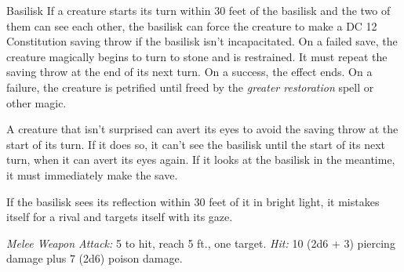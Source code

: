 \documentclass[10pt,a4paper,twoside,bg=print,twocolumn,openany,nodeprecatedcode]{dndbook}
\begin{document}
\begin{DndMonster}[float=t]{Basilisk}
\DndMonsterBasics[
armor-class = {15 (natural armor)},
hit-points = {\DndDice{8d8 + 16}},
speed = {20 ft.}
]
\DndMonsterAbilityScores[
 str = 16,
 dex = 8,
 con = 15,
 int = 2,
 wis = 8,
 cha = 7
]
\DndMonsterDetails[
senses = {darkvision 60 ft., passive perception 9},
challenge = 3,
]
If a creature starts its turn within 30 feet of the basilisk and the two of them can see each other, the basilisk can force the creature to make a DC 12 Constitution saving throw if the basilisk isn't incapacitated. On a failed save, the creature magically begins to turn to stone and is restrained. It must repeat the saving throw at the end of its next turn. On a success, the effect ends. On a failure, the creature is petrified until freed by the  \textit{greater restoration} spell or other magic.

A creature that isn't surprised can avert its eyes to avoid the saving throw at the start of its turn. If it does so, it can't see the basilisk until the start of its next turn, when it can avert its eyes again. If it looks at the basilisk in the meantime, it must immediately make the save.

If the basilisk sees its reflection within 30 feet of it in bright light, it mistakes itself for a rival and targets itself with its gaze.

\textsl{Melee Weapon Attack:} 5 to hit, reach 5 ft., one target. \textsl{Hit:} 10 (2d6 + 3) piercing damage plus 7 (2d6) poison damage.

\end{DndMonster}


\clearpage
\end{document}
